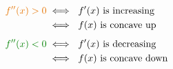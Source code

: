 \documentclass
[handout]
{beamer}
\begin{document}
{{    \begin{mdframed}[style=FactStyle]
      \vspace*{-1.25em}
      \begin{align*}
        {\color{orange!90!black}f''(x) > 0} 
        & \iff\ \text{$f'(x)$\ is increasing} \\
        & \iff\ \text{$f(x)$\ is concave up} \\[0.5em]
        {\color{green!50!black}f''(x) < 0}
        & \iff\ \text{$f'(x)$\ is decreasing} \\
        & \iff\ \text{$f(x)$\ is concave down} 
      \end{align*}
    \end{mdframed}
  }
  \vspace*{3in}

}
\end{document}
